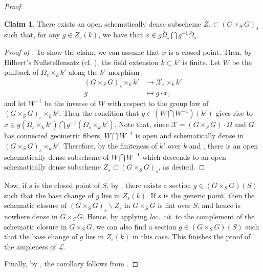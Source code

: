 \documentclass[11pt, reqno]{amsart}
\theoremstyle{plain}
\theoremstyle{definition}
\newtheorem{claim}[theorem]{Claim}
\begin{document}
\begin{proof}
\begin{claim}\label{claim1}
    There exists an open schematically dense subscheme $Z_s\subset (G\times_S G)_s$ such that, for any $g\in Z_s(k)$, we have that $x\in g\overline{\Omega}_s\bigcap g^{-1}\overline{\Omega}_s.$
\end{claim}

\begin{proof}[Proof of ]
To show the claim, we can assume that $x$ is a closed point. Then, by Hilbert's Nullstellensatz (cf. \cite[Theorem~1.7]{GortzWedhorn}), the field extension $k\subset k'$ is finite. Let $W$ be the pullback of $\overline{\Omega}_s\times_k k'$ along the $k'$-morphism
\begin{equation*}
    \begin{split}
        (G\times_S G)_s\times_k k'&\longrightarrow \mathcal{X}_s\times_k k'\\
        g&\longmapsto g\cdot x,
    \end{split}
\end{equation*}
and let $W^{-1}$ be the inverse of $W$ with respect to the group law of $(G\times_S G)_s\times_k k'$. Then the condition that $g\in (W\bigcap W^{-1})(k')$ gives rise to $x\in g(\overline{\Omega}_s\times_k k')\bigcap g^{-1}(\overline{\Omega}_s\times_k k')$. Note that, since $\mathcal{X}=(G\times_S G)\cdot \overline{\Omega}$ and $G$ has connected geometric fibers, $W\bigcap W^{-1}$ is open and schematically dense
in $(G\times_S G)_s\times_k k'$. Therefore, by the finiteness of $k'$ over $k$ and \cite[01JR, 01UA]{stacks-project}, there is an open schematically dense subscheme of $W\bigcap W^{-1}$ which descends to an open schematically dense subscheme $Z_s\subset (G\times_S G)_s$, as desired.
\end{proof}

\noindent Now, if $s$ is the closed point of $S$, by \cite[\S~2.3, Proposition~5]{BLR}, there exists a section $g\in (G\times_S G)(S)$ such that the base change of $g$ lies in $Z_s(k)$. If $s$ is the generic point, then the schematic closure of $(G\times_S G)_s\backslash Z_s$ in $G\times_S G$ is flat over $S$, and hence is nowhere dense in $G\times_S G$. Hence, by applying \emph{loc. cit.} to the complement of the schematic closure in $G\times_S G$, we can also find a section $g\in (G\times_S G)(S)$ such that the base change of $g$ lies in $Z_s(k)$ in this case. This finishes the proof of the ampleness of $\mathcal{L}$.

    Finally, by \cite[Lemma~0BCL~(1)]{stacks-project}, the corollary follows from .
\end{proof}
\end{document}
